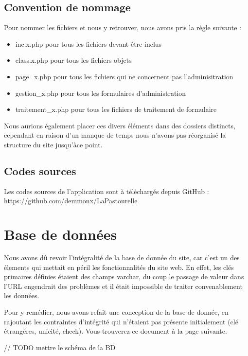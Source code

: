 \documentclass[11pt]{report}
\begin{document}
 \subsection{Convention de nommage}
 Pour nommer les fichiers et nous y retrouver, nous avons pris la règle suivante
 : 
 \begin{itemize}
   \item inc.x.php pour tous les fichiers devant être inclus
   \item class.x.php pour tous les fichiers objets
   \item page\_x.php pour tous les fichiers qui ne concernent pas
   l'adminisitration
   \item gestion\_x.php pour tous les formulaires d'administration
   \item traitement\_x.php pour tous les fichiers de traitement de formulaire \\
 \end{itemize}
 
 \par Nous aurions également placer ces divers éléments dans des dossiers
 distincts, cependant en raison d'un manque de temps nous n'avons pas réorganisé
 la structure du site jusqu'àce point.
 
 \subsection{Codes sources}
 Les codes sources de l'application sont à téléchargés depuis GitHub :
 https://github.com/demmonx/LaPastourelle

\section{Base de données}
Nous avons dû revoir l'intégralité de la base de donnée du site, car c'est un
des élements qui mettait en péril les fonctionnalités du site web. En effet, les
clés primaires définies étaient des champs varchar, du coup le passage de valeur
dans l'URL engendrait des problèmes et il était impossible de traiter
convenablement les données. \\

\par Pour y remédier, nous avons refait une conception de la base de donnée, en
rajoutant les contraintes d'intégrité qui n'étaient pas présente initialement
(clé étrangères, unicité, check). Vous trouverez ce document à la page suivante.

// TODO mettre le schéma de la BD
\end{document}

